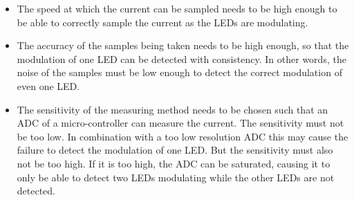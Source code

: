 	\begin{itemize}
		\item The speed at which the current can be sampled needs to be high enough to be able to correctly sample the current as the LEDs are modulating.

		\item The accuracy of the samples being taken needs to be high enough, so that the modulation of one LED can be detected with consistency.
		In other words, the noise of the samples must be low enough to detect the correct modulation of even one LED.

		\item The sensitivity of the measuring method needs to be chosen such that an ADC of a micro-controller can measure the current.
		The sensitivity must not be too low. 
		In combination with a too low resolution ADC this may cause the failure to detect the modulation of one LED.
		But the sensitivity must also not be too high.
		If it is too high, the ADC can be saturated, causing it to only be able to detect two LEDs modulating while the other LEDs are not detected.

	\end{itemize}


















